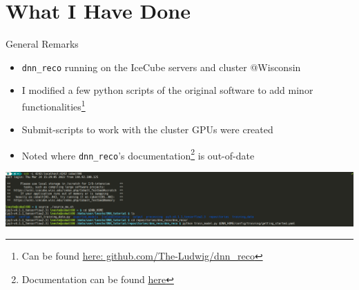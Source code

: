 \section{What I Have Done}
\begin{frame}{General Remarks}
    \begin{itemize}
        \item \texttt{dnn\_reco} running on the IceCube servers and cluster @Wisconsin
        \item I modified a few python scripts of the original software to add minor functionalities\footnote{Can be found \href{https://github.com/The-Ludwig/dnn_reco}{here: github.com/The-Ludwig/dnn\_reco} }
        \item Submit-scripts to work with the cluster GPUs were created
        \item Noted where \texttt{dnn\_reco}'s documentation\footnote{Documentation can be found \href{https://user-web.icecube.wisc.edu/~mhuennefeld/docs/dnn_reco/html/pages/about.html}{here}} is out-of-date
    \end{itemize}

    \includegraphics[width=\textwidth]{media/console.png}
\end{frame}
